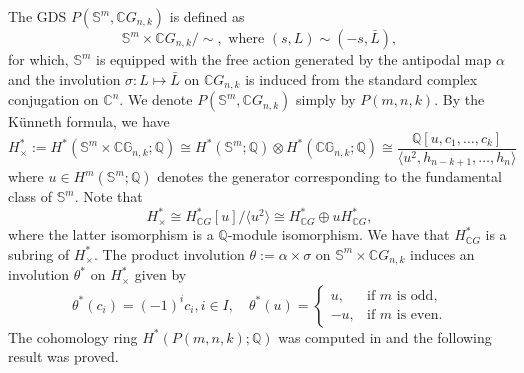 \documentclass{amsart}
\begin{document}
	
	The GDS $P(\mathbb S^m,\mathbb CG_{n,k})$ is defined as
	\[
	\mathbb S^m\times \mathbb CG_{n,k}/\!\!\sim, \text { where } (s,L)\sim (-s,\bar L),
	\]
	for which, $\mathbb S^m$ is equipped with the free action generated by the antipodal map $\alpha$ and the involution $\sigma: L \mapsto \bar L$ on $\mathbb CG_{n,k}$ is induced from the standard complex conjugation on $\mathbb C^n.$ We denote $P(\mathbb S^m,\mathbb CG_{n,k})$ simply by $P(m,n,k).$
	By the K\"unneth formula, we have
	\begin{equation}\label{Cohomology of H_times}
		H_{\times}^* := H^*(\mathbb{S}^m \times \mathbb{CG}_{n,k}; \mathbb{Q}) \cong H^*(\mathbb{S}^m; \mathbb{Q}) \otimes H^*(\mathbb{CG}_{n,k}; \mathbb{Q}) \cong \frac{\mathbb{Q}[u, c_1, \dots, c_k]}{\langle u^2, h_{n-k+1}, \dots, h_n \rangle}
	\end{equation}
	where $u \in H^m(\mathbb S^m; \mathbb Q)$ denotes the generator corresponding to the fundamental class of $\mathbb S^m$. Note that \begin{equation}\label{H in terms of u}
		H^*_{\times} \cong H^*_{\mathbb{C}G}[u]/\langle u^2 \rangle \cong H^*_{\mathbb{C}G} \oplus u H^*_{\mathbb{C}G},
	\end{equation} where the latter isomorphism is a $\mathbb Q$-module isomorphism. We have that $H^*_{\mathbb{C}G}$ is a subring of $H^*_\times$.
	The product involution $\theta:= \alpha\times\sigma$ on $\mathbb S^m\times \mathbb CG_{n,k}$ induces an involution $\theta^*$ on $H^*_\times$ given by
	\begin{equation}\label{defn of theta*}
		\theta^*(c_i) = (-1)^i c_i,i\in I, \quad \theta^*(u) =  
		\begin{cases}  
			u, & \text{if } m \text{ is odd}, \\  
			-u, & \text{if } m \text{ is even}.  
		\end{cases}  
	\end{equation}
	The cohomology ring $ H^*(P(m, n,k);\mathbb Q) $ was computed in \cite{mandal-sankaran2} and the following result was proved.
\end{document}
